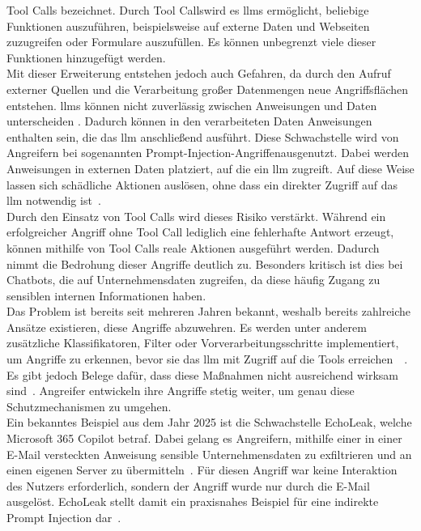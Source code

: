 Tool Calls bezeichnet. Durch \glqq Tool Calls\grqq wird es \acp{llm} ermöglicht, beliebige Funktionen auszuführen, beispielsweise auf externe Daten und Webseiten zuzugreifen 
oder Formulare auszufüllen. Es können unbegrenzt viele dieser Funktionen hinzugefügt werden. \\
Mit dieser Erweiterung entstehen jedoch auch Gefahren, da durch den Aufruf 
externer Quellen und die Verarbeitung großer Datenmengen neue Angriffsflächen entstehen. \acp{llm} können nicht zuverlässig zwischen Anweisungen 
und Daten unterscheiden . Dadurch können in den verarbeiteten Daten Anweisungen enthalten sein, die das \ac{llm} anschließend ausführt. Diese Schwachstelle
wird von Angreifern bei sogenannten \glqq Prompt-Injection-Angriffen\grqq ausgenutzt. Dabei werden Anweisungen in externen Daten platziert, auf die ein \ac{llm} zugreift.
Auf diese Weise lassen sich schädliche Aktionen auslösen, ohne dass ein direkter Zugriff auf das \ac{llm} notwendig ist~\cite{pi15}. \\
Durch den Einsatz von Tool Calls wird dieses Risiko verstärkt. Während ein erfolgreicher Angriff ohne Tool Call lediglich eine fehlerhafte Antwort erzeugt, können
mithilfe von Tool Calls reale Aktionen ausgeführt werden. Dadurch nimmt die Bedrohung dieser Angriffe deutlich zu. Besonders kritisch ist dies bei Chatbots, die 
auf Unternehmensdaten zugreifen, da diese häufig Zugang zu sensiblen internen Informationen haben. \\
Das Problem ist bereits seit mehreren Jahren bekannt, weshalb bereits zahlreiche Ansätze existieren, diese Angriffe abzuwehren. Es werden unter anderem zusätzliche
Klassifikatoren, Filter oder Vorverarbeitungsschritte implementiert, um Angriffe zu erkennen, bevor sie das \ac{llm} mit Zugriff auf die Tools erreichen~\cite[4]{pi9}~\cite[9]{sm10}.
Es gibt jedoch Belege dafür, dass diese Maßnahmen nicht ausreichend wirksam sind~\cite{sm22}. Angreifer entwickeln ihre Angriffe stetig weiter, um genau diese 
Schutzmechanismen zu umgehen. \\
Ein bekanntes Beispiel aus dem Jahr 2025 ist die Schwachstelle \glqq EchoLeak\grqq, welche Microsoft 365 Copilot betraf. Dabei gelang es Angreifern, mithilfe einer in einer E-Mail
versteckten Anweisung sensible Unternehmensdaten zu exfiltrieren und an einen eigenen Server zu übermitteln~\cite{e07}. Für diesen Angriff war keine Interaktion des
Nutzers erforderlich, sondern der Angriff wurde nur durch die E-Mail ausgelöst. EchoLeak stellt damit ein praxisnahes Beispiel für eine indirekte Prompt Injection
dar~\cite{e06}. \\
